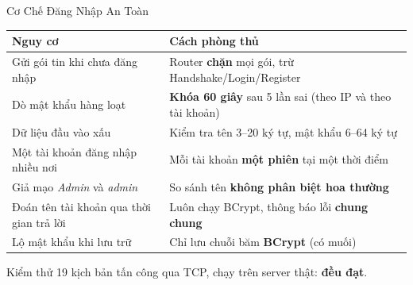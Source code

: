 \begin{frame}{Cơ Chế Đăng Nhập An Toàn}
  \footnotesize
  \renewcommand{\arraystretch}{1.2}
  \begin{tabularx}{\textwidth}{@{}Y Y@{}}
    \toprule
    \textbf{Nguy cơ} & \textbf{Cách phòng thủ} \\
    \midrule
    Gửi gói tin khi chưa đăng nhập & Router \textbf{chặn} mọi gói, trừ Handshake/Login/Register \\
    Dò mật khẩu hàng loạt & \textbf{Khóa 60 giây} sau 5 lần sai (theo IP và theo tài khoản) \\
    Dữ liệu đầu vào xấu & Kiểm tra tên 3--20 ký tự, mật khẩu 6--64 ký tự \\
    Một tài khoản đăng nhập nhiều nơi & Mỗi tài khoản \textbf{một phiên} tại một thời điểm \\
    Giả mạo \textit{Admin} và \textit{admin} & So sánh tên \textbf{không phân biệt hoa thường} \\
    Đoán tên tài khoản qua thời gian trả lời & Luôn chạy BCrypt, thông báo lỗi \textbf{chung chung} \\
    Lộ mật khẩu khi lưu trữ & Chỉ lưu chuỗi băm \textbf{BCrypt} (có muối) \\
    \bottomrule
  \end{tabularx}
  \vspace{0.15cm}
  \begin{exampleblock}{Kiểm thử}
    \footnotesize 19 kịch bản tấn công qua TCP, chạy trên server thật: \textbf{đều đạt}.
  \end{exampleblock}
\end{frame}

